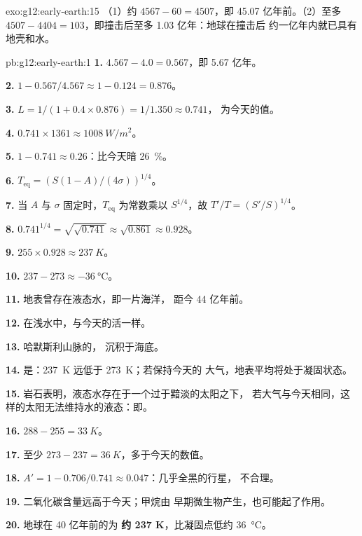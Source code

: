 \begin{solution}{exo:g12:early-earth:15}
（1）约 $4567 - 60 = 4507$，即 45.07 亿年前。（2）至多 $4507 - 4404 =
103$，即撞击后至多 1.03 亿年：地球在撞击后
约一亿年内就已具有地壳和水。
\end{solution}

\begin{solution}{pb:g12:early-earth:1}
\textbf{1.} $4.567 - 4.0 = 0.567$，即 5.67 亿年。

\textbf{2.} $1 - 0.567/4.567 \approx 1 - 0.124 = 0.876$。

\textbf{3.} $L = 1/(1 + 0.4 \times 0.876) = 1/1.350 \approx 0.741$，
为今天的值。

\textbf{4.} $0.741 \times 1361 \approx \qty{1008}{W/m^2}$。

\textbf{5.} $1 - 0.741 \approx 0.26$：比今天暗 \qty{26}{\percent}。

\textbf{6.} $T_{\mathrm{eq}} = \left(S(1-A)/(4\sigma)\right)^{1/4}$。

\textbf{7.} 当 $A$ 与 $\sigma$ 固定时，$T_{\mathrm{eq}}$ 为常数乘以
$S^{1/4}$，故 $T'/T = (S'/S)^{1/4}$。

\textbf{8.} $0.741^{1/4} = \sqrt{\sqrt{0.741}} \approx \sqrt{0.861} \approx
0.928$。

\textbf{9.} $255 \times 0.928 \approx \qty{237}{K}$。

\textbf{10.} $237 - 273 \approx \qty{-36}{\celsius}$。

\textbf{11.} 地表曾存在液态水，即一片海洋，
距今 44 亿年前。

\textbf{12.} 在浅水中，与今天的活一样。

\textbf{13.} 哈默斯利山脉的，
沉积于海底。

\textbf{14.} 是：\qty{237}{K} 远低于 \qty{273}{K}；若保持今天的
大气，地表平均将处于凝固状态。

\textbf{15.} 岩石表明，液态水存在于一个过于黯淡的太阳之下，
若大气与今天相同，这样的太阳无法维持水的液态：即。

\textbf{16.} $288 - 255 = \qty{33}{K}$。

\textbf{17.} 至少 $273 - 237 = \qty{36}{K}$，多于今天的数值。

\textbf{18.} $A' = 1 - 0.706/0.741 \approx 0.047$：几乎全黑的行星，
不合理。

\textbf{19.} 二氧化碳含量远高于今天；甲烷由
早期微生物产生，也可能起了作用。

\textbf{20.} 地球在 40 亿年前的为
\textbf{约 237 K}，比凝固点低约 \qty{36}{\celsius}。
\end{solution}
